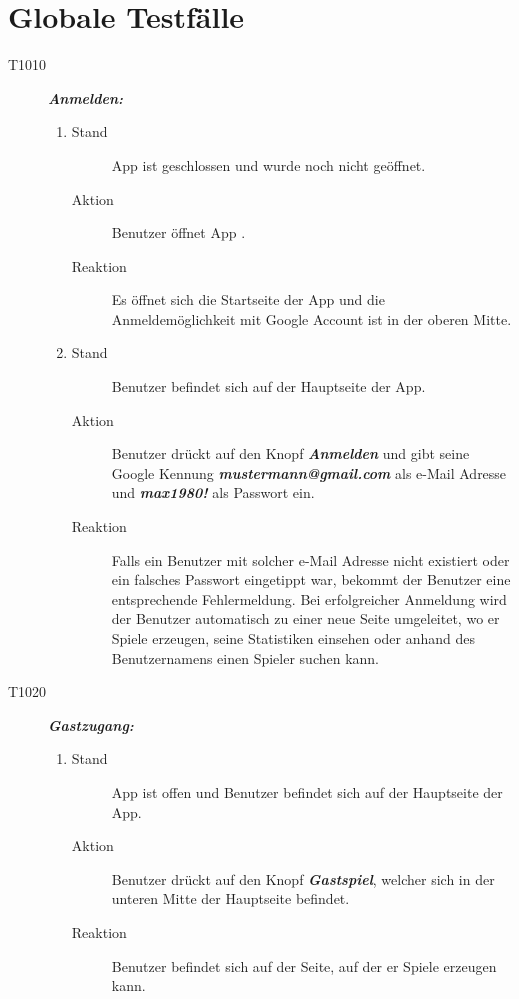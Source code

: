 \documentclass[parskip=full]{scrartcl}
\begin{document}
\section{Globale Testfälle}
\begin{description}
	\item[T1010] \textbf{\textit{Anmelden: }} \\
	\begin{enumerate}
		\item 
		\begin{description}
			\item[Stand] App ist geschlossen und wurde noch nicht geöffnet.
			\item[Aktion] Benutzer öffnet App .
			\item[Reaktion] Es öffnet sich die Startseite der App und die Anmeldemöglichkeit mit Google Account  ist in der oberen Mitte.
		\end{description} 
		\item 
		\begin{description}
			\item[Stand] Benutzer befindet sich auf der Hauptseite der App.
			\item[Aktion] Benutzer drückt auf den Knopf \textit{\textbf{Anmelden}} und gibt seine Google Kennung  \textit{\textbf{mustermann@gmail.com }}als  e-Mail Adresse und \textit{\textbf{max1980!}} als Passwort ein.
			\item[Reaktion]
			Falls ein Benutzer mit solcher e-Mail Adresse nicht existiert oder ein falsches Passwort eingetippt war, bekommt der Benutzer eine entsprechende Fehlermeldung. Bei erfolgreicher Anmeldung wird der Benutzer  automatisch zu einer neue Seite umgeleitet, wo er Spiele erzeugen, seine Statistiken einsehen oder anhand des Benutzernamens einen Spieler suchen kann.
		\end{description}
		
	\end{enumerate}
	
	\item[T1020]  \textbf{\textit{Gastzugang: }} 
	\begin{enumerate}
		\item 
		\begin{description}
			\item[Stand] App ist offen und Benutzer befindet sich auf der Hauptseite der App.
			\item[Aktion] Benutzer drückt auf den Knopf \textbf{\textit{Gastspiel}}, welcher sich in der unteren Mitte der Hauptseite befindet.
			\item[Reaktion] Benutzer befindet sich auf der Seite, auf der er Spiele erzeugen kann.
		\end{description} 
		

\end{enumerate}
\end{description}
\end{document}
